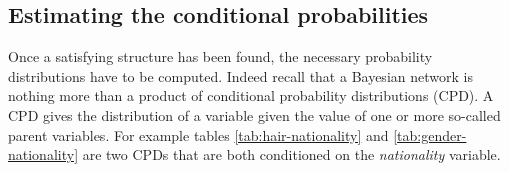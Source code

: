 \documentclass[runningheads]{llncs}
\begin{document}
\subsection{Estimating the conditional probabilities} \label{sec:parameter-estimation}

Once a satisfying structure has been found, the necessary probability distributions have to be computed. Indeed recall that a Bayesian network is nothing more than a product of conditional probability distributions (CPD). A CPD gives the distribution of a variable given the value of one or more so-called parent variables. For example tables \ref{tab:hair-nationality} and \ref{tab:gender-nationality} are two CPDs that are both conditioned on the \emph{nationality} variable. 

\begin{table}[H]
\centering
{}
\vspace{-4mm}
\end{table}
\end{document}

